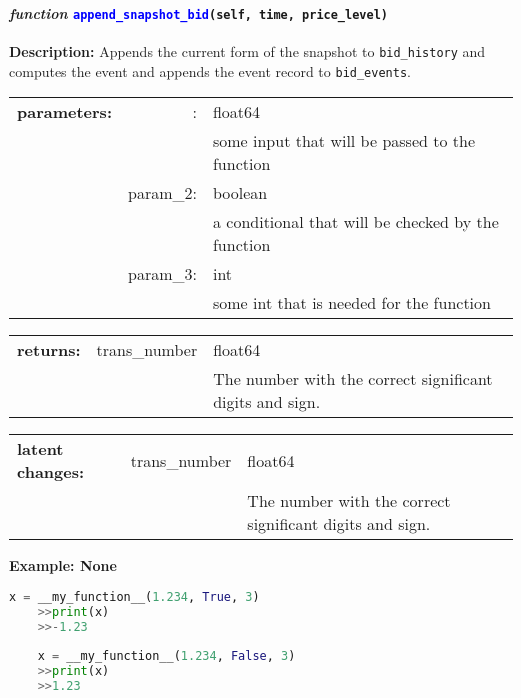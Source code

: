 \paragraph{\textit{function} \textcolor{blue}{\texttt{append\_snapshot\_bid}}\texttt{(self, time, price\_level)}}\hfill\break
\noindent \textbf{Description:} Appends the current form of the snapshot to \texttt{bid\_history} and computes the event and appends the event record to \texttt{bid\_events}. 

\begin{tabular}{r r l }
	\textbf{parameters:}	& : & float64\\
	&  & some input that will be passed to the function\\
	& param\_2:& boolean\\
	&& a conditional that will be checked by the function\\
	& param\_3:& int\\
	&& some int that is needed for the function	
\end{tabular}

\begin{tabular}{l c l}
	\textbf{returns:} & trans\_number & float64\\
	& & The number with the correct significant digits and sign. 
\end{tabular}

\begin{tabular}{l c l}
	\textbf{latent changes:} & trans\_number & float64\\
	& & The number with the correct significant digits and sign. 
\end{tabular}

\textbf{Example: None}
\begin{lstlisting}[language=Python]
	x = __my_function__(1.234, True, 3)
	>>print(x)
	>>-1.23
	
	x = __my_function__(1.234, False, 3)
	>>print(x)
	>>1.23
\end{lstlisting}